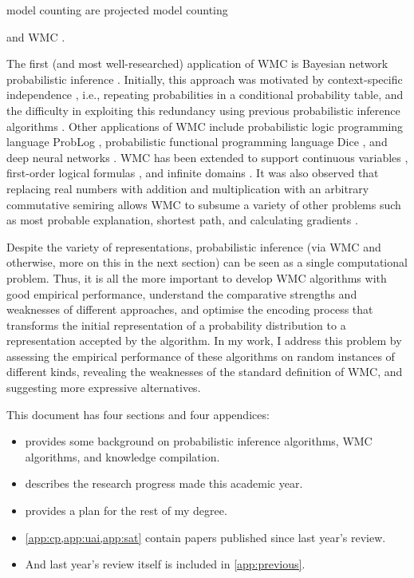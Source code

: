 \documentclass{article}
\makeatletter
\DeclareRobustCommand{\crefnosort}[1]{%
  \begingroup\@cref@sortfalse\cref{#1}\endgroup
}
\makeatother
\begin{document}
model counting are projected model counting {\cite{DBLP:conf/sat/AzizCMS15} and
  WMC \cite{DBLP:journals/ai/ChaviraD08}.

The first (and most well-researched)
application of WMC is Bayesian network probabilistic inference
\cite{DBLP:conf/ecai/BartKLM16,DBLP:conf/ijcai/ChaviraD05,DBLP:conf/sat/ChaviraD06,DBLP:conf/kr/Darwiche02,DBLP:conf/aaai/SangBK05}.
Initially, this approach was motivated by context-specific independence
\cite{DBLP:conf/uai/BoutilierFGK96}, i.e., repeating probabilities in a
conditional probability table, and the difficulty in exploiting this redundancy
using previous probabilistic inference algorithms
\cite{DBLP:conf/kr/Darwiche02}. Other applications of WMC include probabilistic
logic programming language ProbLog
\cite{DBLP:journals/tplp/FierensBRSGTJR15,DBLP:conf/aaai/VlasselaerKDMR16},
probabilistic functional programming language Dice
\cite{DBLP:journals/pacmpl/HoltzenBM20}, and deep neural networks
\cite{DBLP:journals/corr/abs-2010-11926,DBLP:conf/icml/XuZFLB18}. WMC has been
extended to support continuous variables \cite{DBLP:conf/ijcai/BellePB15},
first-order logical formulas
\cite{DBLP:conf/ijcai/BroeckTMDR11,DBLP:journals/cacm/GogateD16}, and infinite
domains \cite{DBLP:conf/aaai/Belle17}. It was also observed that replacing real
numbers with addition and multiplication with an arbitrary commutative semiring
allows WMC to subsume a variety of other problems such as most probable
explanation, shortest path, and calculating gradients
\cite{DBLP:journals/ijar/BelleR20,DBLP:journals/japll/KimmigBR17}.

Despite the variety of representations, probabilistic inference (via WMC and
otherwise, more on this in the next section) can be seen as a single
computational problem. Thus, it is all the more important to develop WMC
algorithms with good empirical performance, understand the comparative strengths
and weaknesses of different approaches, and optimise the encoding process that
transforms the initial representation of a probability distribution to a
representation accepted by the algorithm. In my work, I address this problem by
assessing the empirical performance of these algorithms on random instances of
different kinds, revealing the weaknesses of the standard definition of WMC, and
suggesting more expressive alternatives.

This document has four sections and four appendices:
\begin{itemize}
\item {} provides some background on probabilistic inference
  algorithms, WMC algorithms, and knowledge compilation.
\item {} describes the research progress made this academic
  year.
\item {} provides a plan for the rest of my degree.
\item \crefnosort{app:cp,app:uai,app:sat} contain papers published since last
  year's review.
\item And last year's review itself is included in \cref{app:previous}.
\end{itemize}

}
\end{document}
